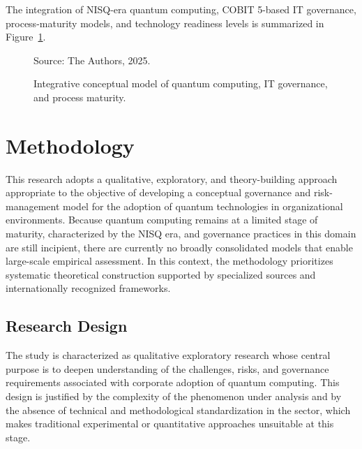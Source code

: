 \documentclass{icis}
\begin{document}
The integration of NISQ-era quantum computing, COBIT 5-based IT governance, process-maturity models, and technology readiness levels is summarized in Figure~\ref{fig:model}.

\begin{figure}[htbp]
\centering
{}
\caption{Integrative conceptual model of quantum computing, IT governance, and process maturity.}
\label{fig:model}
\begin{flushright}\small Source: The Authors, 2025.\end{flushright}
\end{figure}

\section{Methodology}
This research adopts a qualitative, exploratory, and theory-building approach appropriate to the objective of developing a conceptual governance and risk-management model for the adoption of quantum technologies in organizational environments. Because quantum computing remains at a limited stage of maturity, characterized by the NISQ era, and governance practices in this domain are still incipient, there are currently no broadly consolidated models that enable large-scale empirical assessment. In this context, the methodology prioritizes systematic theoretical construction supported by specialized sources and internationally recognized frameworks.

\subsection{Research Design}
The study is characterized as qualitative exploratory research whose central purpose is to deepen understanding of the challenges, risks, and governance requirements associated with corporate adoption of quantum computing. This design is justified by the complexity of the phenomenon under analysis and by the absence of technical and methodological standardization in the sector, which makes traditional experimental or quantitative approaches unsuitable at this stage.
\end{document}
